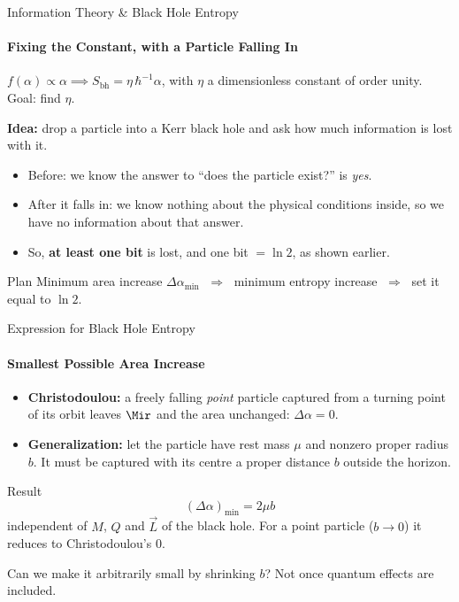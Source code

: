\documentclass[aspectratio=169]{beamer}
\begin{document}

\begin{frame}{Information Theory \& Black Hole Entropy}
\framesubtitle{Fixing the Constant, with a Particle Falling In}
$f(\alpha) \propto \alpha \implies S_{\text{bh}} = \eta\,\hbar^{-1}\alpha$, with $\eta$ a dimensionless constant of order unity. Goal: find $\eta$.

\vspace{4pt}
\textbf{Idea:} drop a particle into a Kerr black hole and ask how much information is lost with it.
\begin{itemize}
  \item Before: we know the answer to ``does the particle exist?'' is \emph{yes}.
  \item After it falls in: we know nothing about the physical conditions inside, so we have no information about that answer.
  \item So, \textbf{at least one bit} is lost, and one bit $=\ln 2$, as shown earlier.
\end{itemize}
\begin{alertblock}{Plan}
Minimum area increase $\Delta\alpha_{\min}$ $\;\Rightarrow\;$ minimum entropy increase $\;\Rightarrow\;$ set it equal to $\ln 2$.
\end{alertblock}
\end{frame}

\begin{frame}{Expression for Black Hole Entropy}
\framesubtitle{Smallest Possible Area Increase}
\begin{itemize}
  \item \textbf{Christodoulou:} a freely falling \emph{point} particle captured from a turning point of its orbit leaves $\Mir$ and the area unchanged: $\Delta\alpha = 0$.
  \item \textbf{Generalization:} let the particle have rest mass $\mu$ and nonzero proper radius $b$. It must be captured with its centre a proper distance $b$ outside the horizon.
\end{itemize}
\begin{block}{Result}
\[
  (\Delta\alpha)_{\min} = 2\mu b
\]
independent of $M$, $Q$ and $\vec L$ of the black hole. For a point particle ($b\to 0$) it reduces to Christodoulou's $0$.
\end{block}
Can we make it arbitrarily small by shrinking $b$? Not once quantum effects are included.
\end{frame}
\end{document}
